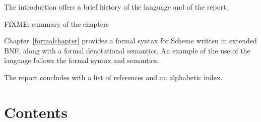 \vest The introduction offers a brief history of the language and of
the report.

\vest FIXME: summary of the chapters

\vest Chapter~\ref{formalchapter} provides a formal syntax for Scheme
written in extended BNF, along with a formal denotational semantics.
An example of the use of the language follows the formal syntax and
semantics.

\vest The report concludes with a list of references and an
alphabetic index.



\vfill
\eject

\chapter*{Contents}
\addvspace{3.5pt}                  %
\renewcommand{\tocshrink}{-3.5pt}  %
{\footnotesize
\tableofcontents
}

\vfill
\eject

